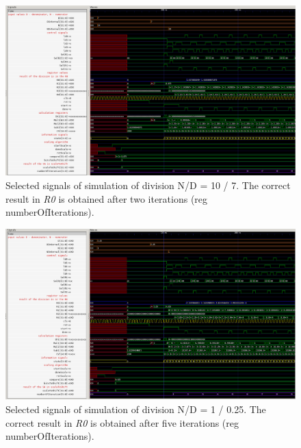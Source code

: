 \documentclass[a4paper, twoside, 11pt]{article}
\begin{document}
\begin{figure}[htbp!]
  \centering
  \includegraphics[width=1\textwidth]{src/png/division-10-div-7.png}
    \caption{Selected signals of simulation of division N/D = 10 / 7. The correct result in \textit{R0} is obtained after two iterations (reg numberOfIterations).}
  \label{fig:division-10-div-7}
\end{figure}


\begin{figure}[htbp!]
  \centering
  \includegraphics[width=1\textwidth]{src/png/division-1-div-0-25.png}
   \caption{Selected signals of simulation of division N/D = 1 / 0.25. The correct result in \textit{R0} is obtained after five iterations (reg numberOfIterations).}
  \label{fig:division-1-div-0-25}
\end{figure}
\end{document}
